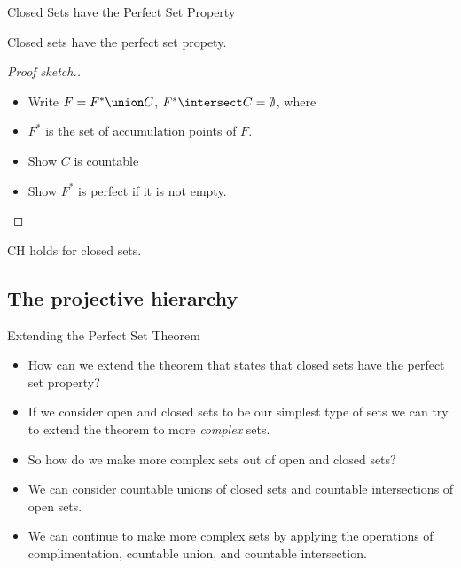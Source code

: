 \documentclass{beamer}
\begin{document}
\begin{frame}{Closed Sets have the Perfect Set Property}

\begin{theorem}
Closed sets have the perfect set propety.
\end{theorem}

\begin{proof}[Proof sketch.]
\begin{itemize}
\item Write $F = F^* \union C$, $F^*\intersect C = \emptyset$, where
\item $F^*$ is the set of accumulation points of $F$.
\item Show $C$ is countable
\item Show $F^*$ is perfect if it is not empty.
\end{itemize}
\end{proof}

\begin{corollary}
CH holds for closed sets.
\end{corollary}

\end{frame}

\subsection{The projective hierarchy}

\begin{frame}{Extending the Perfect Set Theorem}

\begin{itemize}
\item How can we extend the theorem that states that closed sets have the
perfect set property?
\item If we consider open and closed sets to be our simplest type of
sets we can try to extend the theorem to more \emph{complex} sets.
\item So how do we make more complex sets out of open and closed sets?
\item We can consider countable unions of closed sets and countable
intersections of open sets.
\item We can continue to make more complex sets by applying the operations
of complimentation, countable union, and countable intersection.
\end{itemize}

\end{frame}
\end{document}

